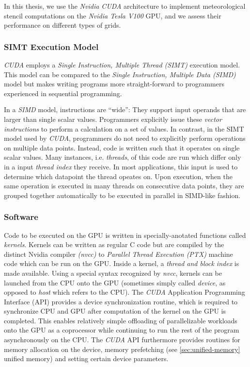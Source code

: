 In this thesis, we use the \emph{Nvidia CUDA} architecture to implement meteorological stencil computations on the \emph{Nvidia Tesla V100} GPU, and we assess their performance on different types of grids.

\subsubsection{SIMT Execution Model}

\emph{CUDA} employs a \emph{Single Instruction, Multiple Thread (SIMT)} execution model. This model can be compared to the \emph{Single Instruction, Multiple Data (SIMD)} model but makes writing programs more straight-forward to programmers experienced in sequential programming.\cite[Section~3.1]{ptx-isa} 

In a \emph{SIMD} model, instructions are ``wide'': They support input operands that are larger than single scalar values. Programmers explicitly issue these \emph{vector instructions} to perform a calculation on a set of values. In contrast, in the SIMT model used by \emph{CUDA}, programmers do not need to explicitly perform operations on multiple data points. Instead, code is written such that it operates on single scalar values. Many instances, i.e. \emph{threads}, of this code are run which differ only in a input \emph{thread index} they receive. In most applications, this input is used to determine which datapoint the thread opeates on. Upon execution, when the same operation is executed in many threads on consecutive data points, they are grouped together automatically to be executed in parallel in SIMD-like fashion.

\subsubsection{Software}

Code to be executed on the GPU is written in specially-anotated functions called \emph{kernels}. Kernels can be written as regular C code but are compiled by the distinct Nvidia compiler \emph{(nvcc)} to \emph{Parallel Thread Execution (PTX)} machine code which can be run on the GPU. Inside a kernel, a \emph{thread and block index} is made available. Using a special syntax recognized by \emph{nvcc}, kernels can be launched from the CPU onto the GPU (sometimes simply called \emph{device}, as opposed to \emph{host} which refers to the CPU). The \emph{CUDA} Application Programming Interface (API) provides a device synchronization routine, which is required to synchronize CPU and GPU after computation of the kernel on the GPU is completed. This enables relatively simple offloading of parallelizable workloads onto the GPU as a coprocessor while continuing to run the rest of the program asynchronously on the CPU. The \emph{CUDA} API furthermore provides routines for memory allocation on the device, memory prefetching (see \ref{sec:unified-memory} unified memory) and setting certain device parameters.


